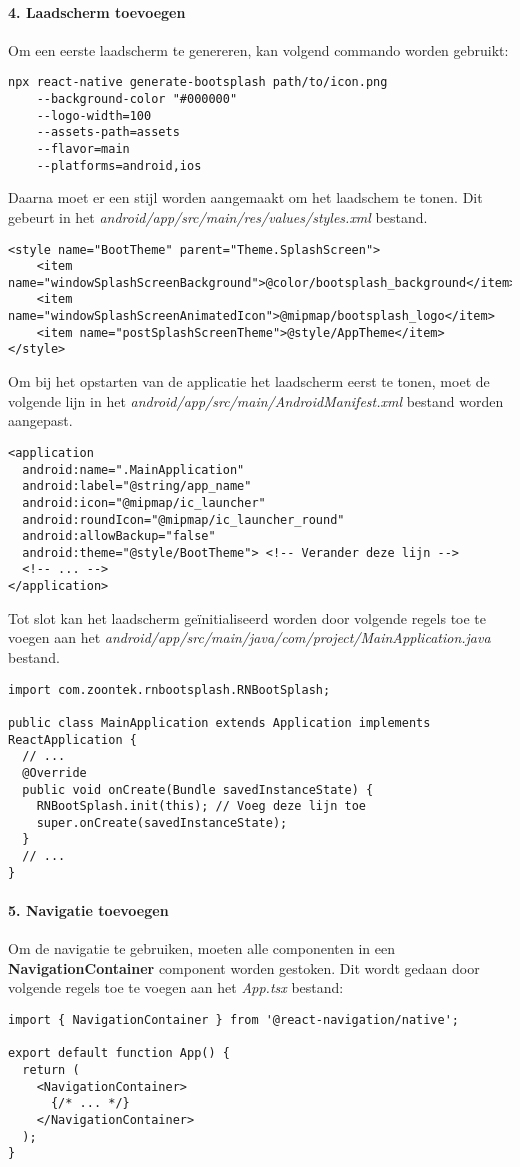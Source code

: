 \paragraph{4. Laadscherm toevoegen}
Om een eerste laadscherm te genereren, kan volgend commando worden gebruikt:
\begin{verbatim}
npx react-native generate-bootsplash path/to/icon.png
    --background-color "#000000" 
    --logo-width=100 
    --assets-path=assets 
    --flavor=main 
    --platforms=android,ios
\end{verbatim}
Daarna moet er een stijl worden aangemaakt om het laadschem te tonen. Dit gebeurt in 
het \textit{android/app/src/main/res/values/styles.xml} bestand.
\begin{verbatim}
<style name="BootTheme" parent="Theme.SplashScreen">
    <item name="windowSplashScreenBackground">@color/bootsplash_background</item>
    <item name="windowSplashScreenAnimatedIcon">@mipmap/bootsplash_logo</item>
    <item name="postSplashScreenTheme">@style/AppTheme</item>
</style>
\end{verbatim}
Om bij het opstarten van de applicatie het laadscherm eerst te tonen, moet de volgende 
lijn in het \textit{android/app/src/main/AndroidManifest.xml} bestand worden aangepast.
\begin{verbatim}
<application
  android:name=".MainApplication"
  android:label="@string/app_name"
  android:icon="@mipmap/ic_launcher"
  android:roundIcon="@mipmap/ic_launcher_round"
  android:allowBackup="false"
  android:theme="@style/BootTheme"> <!-- Verander deze lijn -->
  <!-- ... -->
</application>
\end{verbatim}
Tot slot kan het laadscherm geïnitialiseerd worden door volgende regels toe te voegen aan het
\textit{android/app/src/main/java/com/project/MainApplication.java} bestand.
\begin{verbatim}
import com.zoontek.rnbootsplash.RNBootSplash;

public class MainApplication extends Application implements ReactApplication {
  // ...
  @Override
  public void onCreate(Bundle savedInstanceState) {
    RNBootSplash.init(this); // Voeg deze lijn toe
    super.onCreate(savedInstanceState);
  }
  // ...
}
\end{verbatim}

\paragraph{5. Navigatie toevoegen}
Om de navigatie te gebruiken, moeten alle componenten in een 
\textbf{NavigationContainer} component worden gestoken. Dit wordt gedaan door volgende regels toe te voegen
aan het \textit{App.tsx} bestand:
\begin{verbatim}
import { NavigationContainer } from '@react-navigation/native';

export default function App() {
  return (
    <NavigationContainer>
      {/* ... */}
    </NavigationContainer>
  );
}
\end{verbatim}

